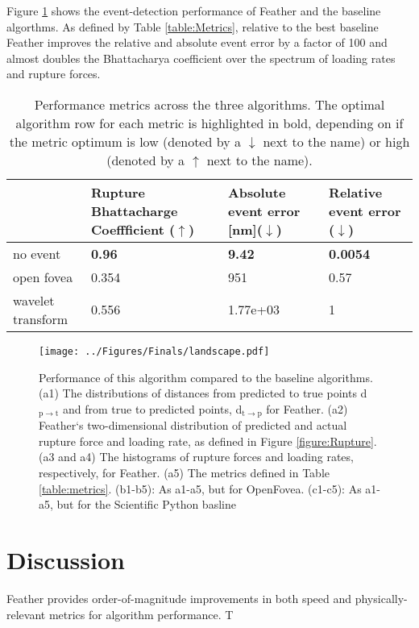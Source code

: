 \documentclass[%
  aip,12pt,tightenlines,
  amsthm,
 amsmath,amssymb
]{article}
\newcommand{\e}[0]{\\ \hline}
\newcommand{\tRef}[1]{Table \ref{table:#1}}
\newcommand{\fRef}[1]{Figure \ref{figure:#1}}
\newcommand{\fLabel}[1]{\label{figure:#1}}
\newcommand{\tLabel}[1]{\label{table:#1}}
\newcommand{\sLabel}[1]{\label{section:#1}}
\newcommand{\firstp}[0]{}
\newcommand{\pl}[0]{\vspace{6pt}}
\newcommand{\pEndF}[0]{ \\ }
\newcommand{\pStartF}[0]{ }
\newcommand{\name}[0]{Feather}
\newcommand{\figwidth}[0]{\linewidth}
\begin{document}
\fRef{Performance} shows the event-detection performance of \name{} and the baseline algorthms. As defined by \tRef{Metrics}, relative to the best baseline \name{} improves the relative and absolute event error by a factor of 100 and almost doubles the Bhattacharya coefficient over the spectrum of loading rates and rupture forces. 

\begin{table}
\begin{tabularx}{\textwidth}{ l || l | l | l | }
\hline \hline
 & Rupture Bhattacharge Coeffficient ($\uparrow$) & Absolute event error [nm]($\downarrow$) & Relative event error ($\downarrow$)\e\hline 
no event & \textbf{0.96} & \textbf{9.42} & \textbf{0.0054}\e
open fovea & 0.354 & 951 & 0.57\e
wavelet transform & 0.556 & 1.77e+03 & 1\e
\end{tabularx}
\caption[Algorithm performance]{\tLabel{AppliedMetrics} Performance metrics across the three algorithms. The optimal algorithm row for each metric is highlighted in bold, depending on if the metric optimum is low (denoted by a $\downarrow$ next to the name) or high (denoted by a $\uparrow$ next to the name).} 
\end{table}




\begin{figure}
\centering
\texttt{[image: ../Figures/Finals/landscape.pdf]}%
\caption[Algorithm Performance]{\noindent\fLabel{Performance}\pStartF Performance of this algorithm compared to the baseline algorithms. (a1) The distributions of distances from predicted to true points d$_{\mathrm{p}\rightarrow\mathrm{t}}$ and from true to predicted points, d$_{\mathrm{t}\rightarrow\mathrm{p}}$ for \name{}. (a2) \name{}`s two-dimensional distribution of predicted and actual rupture force and loading rate, as defined in \fRef{Rupture}. (a3 and a4) The histograms of rupture forces and loading rates, respectively, for \name{}.  (a5) The metrics defined in \tRef{metrics}. (b1-b5): As a1-a5, but for OpenFovea. (c1-c5): As a1-a5, but for the Scientific Python basline \pEndF }
\end{figure}



\section{\sLabel{Discussion}Discussion}


\firstp \pl \name{} provides order-of-magnitude improvements in both speed and physically-relevant metrics for algorithm performance. T
\end{document}
